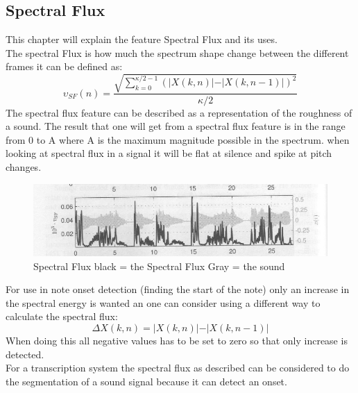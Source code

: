 \subsection{Spectral Flux}
This chapter will explain the feature Spectral Flux and its uses.\\
The spectral Flux is how much the spectrum shape change between the different frames it can be defined as\citep{ACA}:
\begin{equation}\label{Spectral Flux eq}
	\upsilon_{SF}(n) = \frac{\sqrt{\displaystyle\sum_{k=0}^{\kappa/2-1}(\vert X(k,n)\vert-\vert X(k,n-1)\vert)^2}}{\kappa/2}
\end{equation} 
The spectral flux feature can be described as a representation of the roughness of a sound. The result that one will get from a spectral flux feature is in the range from 0 to A where A is the maximum magnitude possible in the spectrum\citep{ACA}. when looking at spectral flux in a signal it will be flat at silence and spike at pitch changes\citep{ACA}.
\begin{figure}[h]
	\begin{center}
		\includegraphics[scale = 0.5]{fig/spectral_flux.jpg}
		\caption{Spectral Flux black = the Spectral Flux Gray = the sound \citep{ACA}}
		\label{Spectral flux pic}
	\end{center}
\end{figure}
For use in note onset detection (finding the start of the note) only an increase in the spectral energy is wanted an one can consider using a different way to calculate the spectral flux\citep{ACA}:
\begin{equation}
	\Delta X(k,n) = \vert X(k,n)\vert-\vert X(k,n-1)\vert
\end{equation}
When doing this all negative values has to be set to zero so that only increase is detected\citep{ACA}.
\\
For a transcription system the spectral flux as described can be considered to do the segmentation of a sound signal because it can detect an onset.
 
